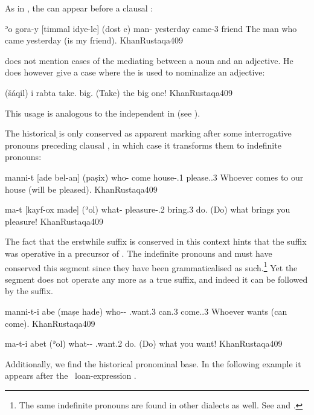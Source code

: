 As in \Sor, the \ez* can appear before a clausal \secn:

{ʾo gora-y [timmal idye-le] (dost \cb{}e)}
{ man-\ez{} yesterday came-3\masc{} friend \cb{}\cop}
{The man who came yesterday (is my friend).}
{KhanRustaqa}{409}

\citet[409]{KhanRustaqa} does not mention cases of the \ez* mediating between a noun and an adjective. He does however give a case where the \ez* is used to nominalize an adjective:

{(šáqil) i rabta}
{take.\imp{} \ez{} big.\fem{}}
{(Take) the big one!}
{KhanRustaqa}{409}

This usage is analogous to the independent \ez* in \Sor (see ).

The historical \d \lnk* is only conserved as apparent \cst* marking after some interrogative pronouns preceding clausal \secns, in which case it transforms them to indefinite pronouns: 


{manni-t [ade bel-an] (paṣix)}
{who-\cst{} come house-\poss.1\pl{} please.\subj.3\masc}
{Whoever comes to our house (will be pleased).}
{KhanRustaqa}{409}

{ma-t [kayf-ox made] (ʾol)}
{what-\cst{} pleasure-\poss.2\masc{} bring.3\masc{} do.\imp}
{(Do) what brings you pleasure!}
{KhanRustaqa}{409}

The fact that the erstwhile \cst* {} suffix is conserved in this context hints that the \ed \cst* suffix was operative in a precursor of \Rus. The indefinite pronouns  and  must have conserved this segment since they have been grammaticalised as such.\footnote{The same indefinite pronouns are found in other dialects as well. See \JZax {} and \JUrm {}.} Yet  the  segment does not operate any more as a true \cst* suffix, and indeed it can be followed by the \ez* suffix.

{manni-t-i abe (maṣe hade)}
{who-\cst-\ez{} \subj.want.3\masc{} can.3\masc{} come.\subj.3\masc{}}
{Whoever wants (can come).}
{KhanRustaqa}{409}

{ma-t-i abet (ʾol)}
{what-\cst-\ez{} \subj.want.2\masc{} do.\imp}
{(Do) what you want!}
{KhanRustaqa}{409}

Additionally, we find the historical  pronominal base. In the following example it appears after the \MHeb\ loan-expression .


